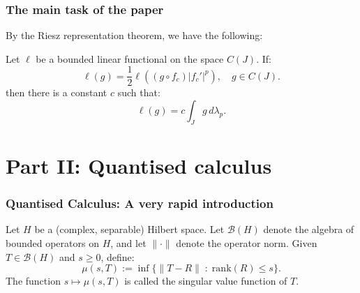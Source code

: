 \documentclass{beamer} %
\theoremstyle{definition} %
\begin{document}
% 
%     

\begin{frame}\frametitle{The main task of the paper}
    By the Riesz representation theorem, we have the following:
    \begin{theorem}
        Let $\ell$ be a bounded linear functional on the space $C(J)$. If:
        \begin{equation*}
            \ell(g) = \frac{1}{2}\ell((g\circ f_c)|f_c'|^p),\quad g \in C(J).
        \end{equation*}
        then there is a constant $c$ such that:
        \begin{equation*}
            \ell(g) = c\int_{J} g\,d\lambda_p.
        \end{equation*}
    \end{theorem}
\end{frame}
\section{Part II: Quantised calculus}

\begin{frame}\frametitle{Quantised Calculus: A very rapid introduction}
    Let $H$ be a (complex, separable) Hilbert space. Let $\mathcal{B}(H)$ denote the algebra
    of bounded operators on $H$, and let $\|\cdot\|$ denote the operator norm. Given $T \in \mathcal{B}(H)$ and $s \geq 0$, define:
    \begin{equation*}
        \mu(s,T) := \inf\{\|T-R\|\;:\;\mathrm{rank}(R) \leq s\}.
    \end{equation*}
    The function $s\mapsto \mu(s,T)$ is called the singular value function of $T$.
\end{frame}
\end{document}

